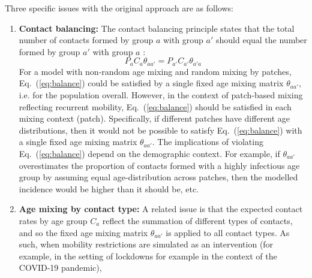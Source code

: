 Three specific issues with the original approach are as follows:
\begin{enumerate}
  \item \textbf{Contact balancing:}\label{issue:balance}
  The contact balancing principle states that
  the total number of contacts formed by group $a$ with group $a'$
  should equal the number formed by group $a'$ with group $a$ \cite{Arregui2018}:
  \begin{equation}\label{eq:balance}
    P_{a} C_{a} \theta_{aa'} = P_{a'} C_{a'} \theta_{a'a}
  \end{equation}
  For a model with non-random age mixing and random mixing by patches,
  Eq.~(\ref{eq:balance}) could be satisfied by a single fixed age mixing matrix $\theta_{aa'}$,
  i.e. for the population overall.
  However, in the context of patch-based mixing reflecting recurrent mobility,
  Eq.~(\ref{eq:balance}) should be satisfied in each mixing context (patch).
  Specifically, if different patches have different age distributions,
  then it would not be possible to satisfy Eq.~(\ref{eq:balance})
  with a single fixed age mixing matrix $\theta_{aa'}$.
  The implications of violating Eq.~(\ref{eq:balance}) depend on the demographic context.
  For example, if $\theta_{aa'}$ overestimates
  the proportion of contacts formed with a highly infectious age group
  by assuming equal age-distribution across patches,
  then the modelled incidence would be higher than it should be, etc.
  \item \textbf{Age mixing by contact type:}\label{issue:age-mix}
  A related issue is that the expected contact rates by age group $C_a$ reflect
  the summation of different types of contacts,
  and so the fixed age mixing matrix $\theta_{aa'}$ is applied to all contact types.
  As such, when mobility restrictions are simulated as an intervention
  (for example, in the setting of lockdowns for example in the context of the COVID-19 pandemic),

\end{enumerate}
